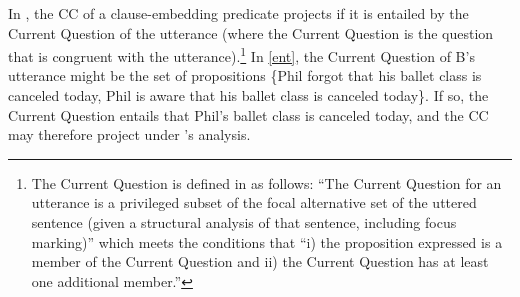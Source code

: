 \documentclass[a4paper,12pt,twoside]{article}
\newcommand{\poscite}[1]{\citeauthor{#1}'s \citeyear{#1}}
\begin{document}
    In \citealt{simons_best_2017}, the CC of a clause-embedding predicate projects if it is entailed by the Current Question of the utterance (where the Current Question is the question that is congruent with the utterance).\footnote{The Current Question is defined in \citealt[194]{simons_best_2017} as follows: ``The Current Question for an utterance is a privileged subset of the focal alternative set of the uttered sentence (given a structural analysis of that sentence, including focus marking)'' which meets the conditions that ``i) the proposition expressed is a member of the Current Question and ii) the Current Question has at least one additional member.''} In \ref{ent},  the Current Question of B's utterance might be the set of propositions \{Phil forgot that his ballet class is canceled today, Phil is aware that his ballet class is canceled today\}. If so, the Current Question entails that Phil's ballet class is canceled today, and the CC may therefore project under \poscite{simons_best_2017} analysis.



  
\end{document}
